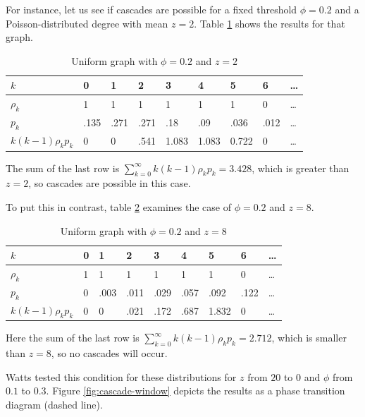 \documentclass{sig-alternate-05-2015}
\begin{document}
For instance, let us see if cascades are possible for a fixed threshold $\phi = 0.2$ and a Poisson-distributed degree with mean $z = 2$. Table \ref{tab:z2} shows the results for that graph.

\begin{table}[t!]
\centering
\caption{Uniform graph with $\phi = 0.2$ and $z = 2$}
\label{tab:z2}
\begin{tabular}{|l|l|l|l|l|l|l|l|l|}
\hline
$k$                       & 0     & 1      & 2     & 3      & 4      & 5      & 6     & \ldots\\ \hline
$\rho_k$                  & 1     & 1      & 1     & 1      & 1      & 1      & 0     & \ldots\\ \hline
$p_k$                     & .135  & .271   & .271  & .18    & .09    & .036   & .012  & \ldots\\ \hline
$k (k-1) \rho_k p_k$      & 0     & 0      & .541  & 1.083  & 1.083  & 0.722  & 0     & \ldots\\ \hline
\end{tabular}
\end{table}

The sum of the last row is $\sum_{k=0}^\infty k (k-1) \rho_k p_k = 3.428$, which is greater than $z = 2$, so cascades are possible in this case.

To put this in contrast, table \ref{tab:z8} examines the case of $\phi = 0.2$ and $z = 8$.

\begin{table}
\centering
\caption{Uniform graph with $\phi = 0.2$ and $z = 8$}
\label{tab:z8}
\begin{tabular}{|l|l|l|l|l|l|l|l|l|}
\hline
$k$                       & 0  & 1     & 2     & 3     & 4     & 5      & 6     & \ldots\\ \hline
$\rho_k$                  & 1  & 1     & 1     & 1     & 1     & 1      & 0     & \ldots\\ \hline
$p_k$                     & 0  & .003  & .011  & .029  & .057  & .092   & .122  & \ldots\\ \hline
$k (k-1) \rho_k p_k$      & 0  & 0     & .021  & .172  & .687  & 1.832  & 0     & \ldots\\ \hline
\end{tabular}
\end{table}

Here the sum of the last row is $\sum_{k=0}^\infty k (k-1) \rho_k p_k = 2.712$, which is smaller than $z = 8$, so no cascades will occur.

Watts tested this condition for these distributions for $z$ from $20$ to $0$ and $\phi$ from $0.1$ to $0.3$. Figure \ref{fig:cascade-window} depicts the results as a phase transition diagram (dashed line).
\end{document}
